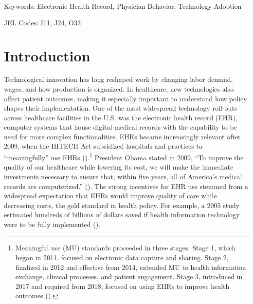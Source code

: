 \documentclass[12pt]{article}
\begin{document}
\vspace{2.5in}
	
	\noindent Keywords: Electronic Health Record, Physician Behavior, Technology Adoption

    \vspace{2mm}
	
	\noindent JEL Codes: I11, J24, O33

	
	\onehalfspacing
	
	\newpage

\section{Introduction}

Technological innovation has long reshaped work by changing labor demand, wages, and how production is organized. In healthcare, new technologies also affect patient outcomes, making it especially important to understand how policy shapes their implementation. One of the most widespread technology roll-outs across healthcare facilities in the U.S. was the electronic health record (EHR), computer systems that house digital medical records with the capability to be used for more complex functionalities. EHRs became increasingly relevant after 2009, when the HITECH Act subsidized hospitals and practices to ``meaningfully'' use EHRs (\cite{hitech}).\footnote{Meaningful use (MU) standards proceeded in three stages. Stage 1, which began in 2011, focused on electronic data capture and sharing. Stage 2, finalized in 2012 and effective from 2014, extended MU to health information exchange, clinical processes, and patient engagement. Stage 3, introduced in 2017 and required from 2018, focused on using EHRs to improve health outcomes (\cite{meanuse}).} President Obama stated in 2009, “To improve the quality of our healthcare while lowering its cost, we will make the immediate investments necessary to ensure that, within five years, all of America’s medical records are computerized.” (\cite{presquote}). The strong incentives for EHR use stemmed from a widespread expectation that EHRs would improve quality of care while decreasing costs, the gold standard in health policy. For example, a 2005 study estimated hundreds of billions of dollars saved if health information technology were to be fully implemented (\cite{hillestad2005}).
\end{document}
